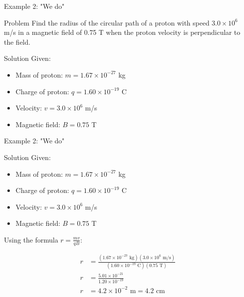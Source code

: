 \documentclass{beamer}
\begin{document}
\begin{frame}{Example 2: "We do"}
\begin{block}{Problem}
Find the radius of the circular path of a proton with speed $3.0 \times 10^6$ m/s in a magnetic field of 0.75 T when the proton velocity is perpendicular to the field.
\end{block}
\pause

\begin{block}{Solution}
Given:
\begin{itemize}
\item Mass of proton: $m = 1.67 \times 10^{-27}$ kg
\item Charge of proton: $q = 1.60 \times 10^{-19}$ C
\item Velocity: $v = 3.0 \times 10^6$ m/s
\item Magnetic field: $B = 0.75$ T
\end{itemize}

\end{block}
\end{frame}
\begin{frame}{Example 2: "We do"}
\pause
\begin{block}{Solution}
Given:
\begin{itemize}
\item Mass of proton: $m = 1.67 \times 10^{-27}$ kg
\item Charge of proton: $q = 1.60 \times 10^{-19}$ C
\item Velocity: $v = 3.0 \times 10^6$ m/s
\item Magnetic field: $B = 0.75$ T
\end{itemize}

Using the formula $r = \frac{mv}{qB}$:

\pause

\begin{align}
r &= \frac{(1.67 \times 10^{-27} \text{ kg})(3.0 \times 10^6 \text{ m/s})}{(1.60 \times 10^{-19} \text{ C})(0.75 \text{ T})} \\
r &= \frac{5.01 \times 10^{-21}}{1.20 \times 10^{-19}} \\
r &= 4.2 \times 10^{-2} \text{ m} = 4.2 \text{ cm}
\end{align}
\end{block}
\end{frame}
\end{document}
